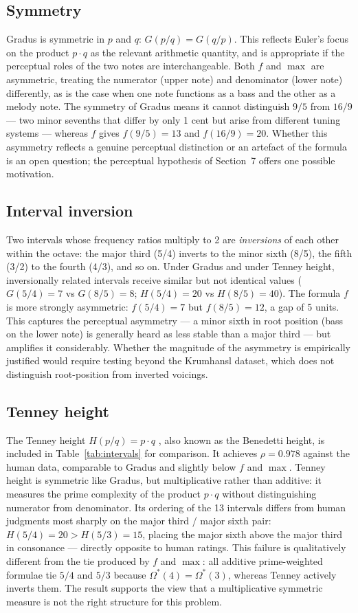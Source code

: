 \documentclass[11pt,a4paper]{article}
\newcommand{\Os}{\Omega^{\!*}}
\begin{document}
\subsection*{Symmetry}
Gradus is symmetric in $p$ and $q$: $G(p/q) = G(q/p)$. This reflects Euler's
focus on the product $p \cdot q$ as the relevant arithmetic quantity, and is
appropriate if the perceptual roles of the two notes are interchangeable.
Both $f$ and $\max$ are asymmetric, treating the numerator (upper note) and
denominator (lower note) differently, as is the case when one note functions
as a bass and the other as a melody note. The symmetry of Gradus means it
cannot distinguish $9/5$ from $16/9$ --- two minor sevenths that differ by
only 1 cent but arise from different tuning systems --- whereas $f$ gives
$f(9/5) = 13$ and $f(16/9) = 20$. Whether this asymmetry reflects a genuine
perceptual distinction or an artefact of the formula is an open question;
the perceptual hypothesis of Section~7 offers one possible motivation.

\subsection*{Interval inversion}
Two intervals whose frequency ratios multiply to 2 are \emph{inversions} of
each other within the octave: the major third (5/4) inverts to the minor
sixth (8/5), the fifth (3/2) to the fourth (4/3), and so on. Under Gradus
and under Tenney height, inversionally related intervals receive similar but
not identical values ($G(5/4) = 7$ vs $G(8/5) = 8$; $H(5/4) = 20$ vs
$H(8/5) = 40$). The formula $f$ is more strongly asymmetric: $f(5/4) = 7$
but $f(8/5) = 12$, a gap of 5 units. This captures the perceptual asymmetry
--- a minor sixth in root position (bass on the lower note) is generally
heard as less stable than a major third --- but amplifies it considerably.
Whether the magnitude of the asymmetry is empirically justified would require
testing beyond the Krumhansl dataset, which does not distinguish root-position
from inverted voicings.

\subsection*{Tenney height}
The Tenney height $H(p/q) = p \cdot q$ \cite{tenney1988}, also known as the
Benedetti height, is included in Table~\ref{tab:intervals} for comparison. It
achieves $\rho = 0.978$ against the human data, comparable to Gradus and
slightly below $f$ and $\max$. Tenney height is symmetric like Gradus, but
multiplicative rather than additive: it measures the prime complexity of the
product $p \cdot q$ without distinguishing numerator from denominator. Its
ordering of the 13 intervals differs from human judgments most sharply on the
major third / major sixth pair: $H(5/4) = 20 > H(5/3) = 15$, placing the
major sixth above the major third in consonance --- directly opposite to human
ratings. This failure is qualitatively different from the tie produced by $f$
and $\max$: all additive prime-weighted formulae tie $5/4$ and $5/3$ because
$\Os(4) = \Os(3)$, whereas Tenney actively inverts them. The result supports
the view that a multiplicative symmetric measure is not the right structure
for this problem.
\end{document}
